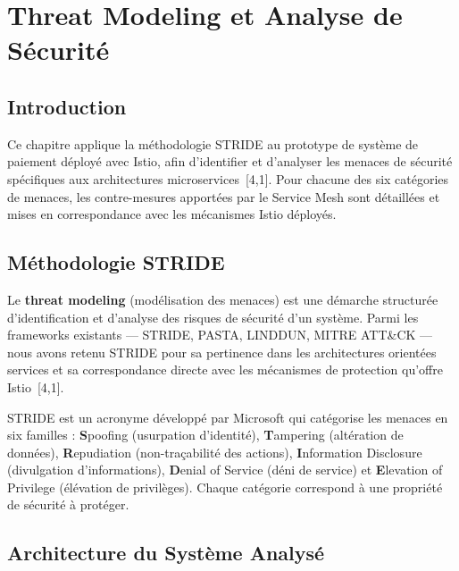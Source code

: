 \chapter{Threat Modeling et Analyse de Sécurité}

\section*{Introduction}
\label{sec:introduction-ch3}

Ce chapitre applique la méthodologie STRIDE au prototype de système de paiement
déployé avec Istio, afin d'identifier et d'analyser les menaces de sécurité
spécifiques aux architectures microservices~[4,1]. Pour chacune des six catégories
de menaces, les contre-mesures apportées par le Service Mesh sont détaillées et
mises en correspondance avec les mécanismes Istio déployés.

\section{Méthodologie STRIDE}

Le \textbf{threat modeling} (modélisation des menaces) est une démarche structurée
d'identification et d'analyse des risques de sécurité d'un système. Parmi les
frameworks existants --- STRIDE, PASTA, LINDDUN, MITRE ATT\&CK --- nous avons
retenu STRIDE pour sa pertinence dans les architectures orientées services et sa
correspondance directe avec les mécanismes de protection qu'offre Istio~[4,1].

STRIDE est un acronyme développé par Microsoft qui catégorise les menaces en six
familles : \textbf{S}poofing (usurpation d'identité), \textbf{T}ampering
(altération de données), \textbf{R}epudiation (non-traçabilité des actions),
\textbf{I}nformation Disclosure (divulgation d'informations), \textbf{D}enial of
Service (déni de service) et \textbf{E}levation of Privilege (élévation de
privilèges). Chaque catégorie correspond à une propriété de sécurité à protéger.

\section{Architecture du Système Analysé}

